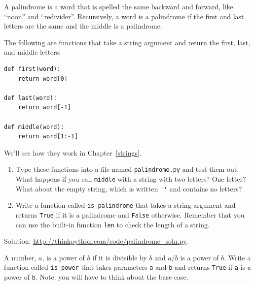 \documentclass[10pt]{book}
\begin{document}
\begin{exercise}
\label{palindrome}

A palindrome is a word that is spelled the same backward and
forward, like ``noon'' and ``redivider''.  Recursively, a word
is a palindrome if the first and last letters are the same
and the middle is a palindrome.

The following are functions that take a string argument and
return the first, last, and middle letters:

\begin{verbatim}
def first(word):
    return word[0]

def last(word):
    return word[-1]

def middle(word):
    return word[1:-1]
\end{verbatim}
%
We'll see how they work in Chapter~\ref{strings}.

\begin{enumerate}

\item Type these functions into a file named {\tt palindrome.py}
and test them out.  What happens if you call {\tt middle} with
a string with two letters?  One letter?  What about the empty
string, which is written \verb"''" and contains no letters?

\item Write a function called \verb"is_palindrome" that takes
a string argument and returns {\tt True} if it is a palindrome
and {\tt False} otherwise.  Remember that you can use the
built-in function {\tt len} to check the length of a string.

\end{enumerate}

Solution: \url{http://thinkpython.com/code/palindrome_soln.py}.

\end{exercise}

\begin{exercise}

A number, $a$, is a power of $b$ if it is divisible by $b$
and $a/b$ is a power of $b$.  Write a function called
\verb"is_power" that takes parameters {\tt a} and {\tt b}
and returns {\tt True} if {\tt a} is a power of {\tt b}.
Note: you will have to think about the base case.

\end{exercise}
\end{document}

